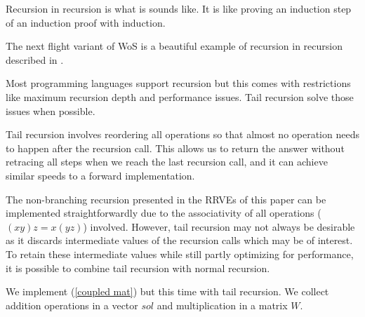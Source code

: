 \documentclass[a4paper,12pt]{article}
\begin{document}
\begin{pythonn} 
\end{pythonn}

\begin{technique}
    Recursion in recursion is what is sounds like. It is like proving an induction
    step of an induction proof with induction.
\end{technique}


\begin{related}
    The next flight variant of WoS
    is a beautiful example of recursion in recursion described in
    \cite{sawhney_grid-free_2022}.
\end{related}

Most programming languages support recursion but this comes with restrictions
like maximum recursion depth and performance issues. Tail recursion solve those
issues when possible.

\begin{technique}
    Tail recursion involves reordering all operations
    so that almost no operation needs to happen after
    the recursion call. This allows us to return the
    answer without retracing all steps when we reach
    the last recursion call, and it can achieve similar
    speeds to a forward implementation.
\end{technique}

The non-branching recursion presented in the RRVEs of this paper
can be implemented straightforwardly due to the associativity of
all operations ($(xy)z = x(yz)$) involved. However, tail recursion
may not always be desirable as it discards intermediate values of
the recursion calls which may be of interest. To retain these intermediate
values while still partly optimizing for performance, it is possible
to combine tail recursion with normal recursion.

\begin{pythonn}
    We implement (\ref{coupled mat}) but this time with tail recursion.
    We collect addition operations in a vector $sol$ and multiplication
    in a matrix $W$.
    \vspace{0.3cm}
\end{pythonn}
\end{document}

